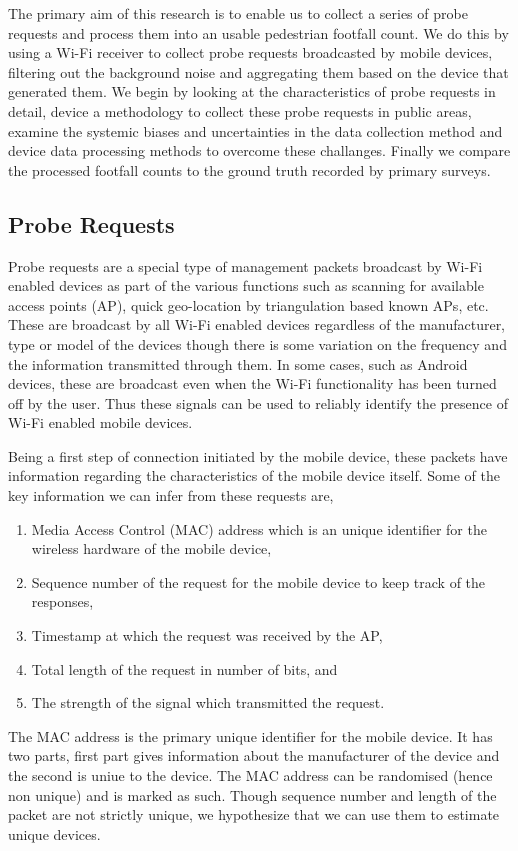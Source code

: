 The primary aim of this research is to enable us to collect a series of probe requests and process them into an usable pedestrian footfall count. We do this by using a Wi-Fi receiver to collect probe requests broadcasted by mobile devices, filtering out the background noise and aggregating them based on the device that generated them. We begin by looking at the characteristics of probe requests in detail, device a methodology to collect these probe requests in public areas, examine the systemic biases and uncertainties in the data collection method and device data processing methods to overcome these challanges. Finally we compare the processed footfall counts to the ground truth recorded by primary surveys.

\subsection{Probe Requests}
Probe requests are a special type of management packets broadcast by Wi-Fi enabled devices as part of the various functions such as scanning for available access points (AP), quick geo-location by triangulation based known APs, etc.
These are broadcast by all Wi-Fi enabled devices regardless of the manufacturer, type or model of the devices though there is some variation on the frequency and the information transmitted through them.
In some cases, such as Android devices, these are broadcast even when the Wi-Fi functionality has been turned off by the user.
Thus these signals can be used to reliably identify the presence of Wi-Fi enabled mobile devices.

Being a first step of connection initiated by the mobile device, these packets have information regarding the characteristics of the mobile device itself. Some of the key information we can infer from these requests are,
\begin{enumerate}
	\item Media Access Control (MAC) address which is an unique identifier for the wireless hardware of the mobile device,
	\item Sequence number of the request for the mobile device to keep track of the responses,
	\item Timestamp at which the request was received by the AP,
	\item Total length of the request in number of bits, and 
	\item The strength of the signal which transmitted the request.
\end{enumerate}
The MAC address is the primary unique identifier for the mobile device.
It has two parts, first part gives information about the manufacturer of the device and the second is uniue to the device. The MAC address can be randomised (hence non unique) and is marked as such. Though sequence number and length of the packet are not strictly unique, we hypothesize that we can use them to estimate unique devices.

